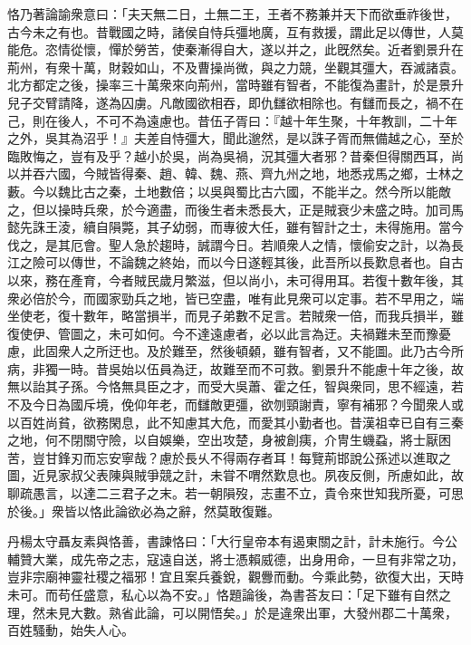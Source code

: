 \begin{pinyinscope}
 
 
 
 恪乃著論諭衆意曰：「夫天無二日，土無二王，王者不務兼并天下而欲垂祚後世，古今未之有也。昔戰國之時，諸侯自恃兵彊地廣，互有救援，謂此足以傳世，人莫能危。恣情從懷，憚於勞苦，使秦漸得自大，遂以并之，此旣然矣。近者劉景升在荊州，有衆十萬，財穀如山，不及曹操尚微，與之力競，坐觀其彊大，吞滅諸袁。北方都定之後，操率三十萬衆來向荊州，當時雖有智者，不能復為畫計，於是景升兒子交臂請降，遂為囚虜。凡敵國欲相吞，即仇讎欲相除也。有讎而長之，禍不在己，則在後人，不可不為遠慮也。昔伍子胥曰：『越十年生聚，十年教訓，二十年之外，吳其為沼乎！』夫差自恃彊大，聞此邈然，是以誅子胥而無備越之心，至於臨敗悔之，豈有及乎？越小於吳，尚為吳禍，況其彊大者邪？昔秦但得關西耳，尚以并吞六國，今賊皆得秦、趙、韓、魏、燕、齊九州之地，地悉戎馬之鄉，士林之藪。今以魏比古之秦，土地數倍；以吳與蜀比古六國，不能半之。然今所以能敵之，但以操時兵衆，於今適盡，而後生者未悉長大，正是賊衰少未盛之時。加司馬懿先誅王淩，續自隕斃，其子幼弱，而專彼大任，雖有智計之士，未得施用。當今伐之，是其厄會。聖人急於趨時，誠謂今日。若順衆人之情，懷偷安之計，以為長江之險可以傳世，不論魏之終始，而以今日遂輕其後，此吾所以長歎息者也。自古以來，務在產育，今者賊民歲月繁滋，但以尚小，未可得用耳。若復十數年後，其衆必倍於今，而國家勁兵之地，皆已空盡，唯有此見衆可以定事。若不早用之，端坐使老，復十數年，略當損半，而見子弟數不足言。若賊衆一倍，而我兵損半，雖復使伊、管圖之，未可如何。今不達遠慮者，必以此言為迂。夫禍難未至而豫憂慮，此固衆人之所迂也。及於難至，然後頓顙，雖有智者，又不能圖。此乃古今所病，非獨一時。昔吳始以伍員為迂，故難至而不可救。劉景升不能慮十年之後，故無以詒其子孫。今恪無具臣之才，而受大吳蕭、霍之任，智與衆同，思不經遠，若不及今日為國斥境，俛仰年老，而讎敵更彊，欲刎頸謝責，寧有補邪？今聞衆人或以百姓尚貧，欲務閑息，此不知慮其大危，而愛其小勤者也。昔漢祖幸已自有三秦之地，何不閉關守險，以自娛樂，空出攻楚，身被創痍，介冑生蟣蝨，將士厭困苦，豈甘鋒刃而忘安寧哉？慮於長乆不得兩存者耳！每覽荊邯說公孫述以進取之圖，近見家叔父表陳與賊爭競之計，未甞不喟然歎息也。夙夜反側，所慮如此，故聊疏愚言，以達二三君子之末。若一朝隕歿，志畫不立，貴令來世知我所憂，可思於後。」衆皆以恪此論欲必為之辭，然莫敢復難。
 
 
 
 
 丹楊太守聶友素與恪善，書諫恪曰：「大行皇帝本有遏東關之計，計未施行。今公輔贊大業，成先帝之志，寇遠自送，將士憑賴威德，出身用命，一旦有非常之功，豈非宗廟神靈社稷之福邪！宜且案兵養銳，觀釁而動。今乘此勢，欲復大出，天時未可。而苟任盛意，私心以為不安。」恪題論後，為書荅友曰：「足下雖有自然之理，然未見大數。熟省此論，可以開悟矣。」於是違衆出軍，大發州郡二十萬衆，百姓騷動，始失人心。
 

\end{pinyinscope}
